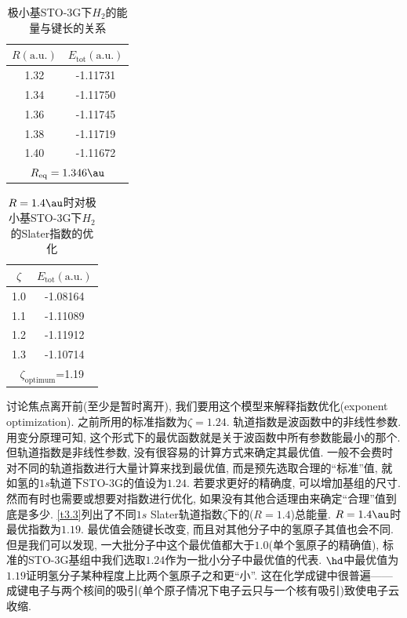 \begin{table}[H]
	\centering
	\caption{极小基STO-3G下$H_2$的能量与键长的关系}
	\begin{tabular}{cc}
		\hline
		$R \mathrm{(a.u.)}$ & $E_\mathrm{tot}\mathrm{(a.u.)}$\\\hline
		1.32      & -1.11731\\
		1.34     & -1.11750\\
		1.36     & -1.11745\\
		1.38     & -1.11719\\
		1.40     & -1.11672\\\hline
		\multicolumn{2}{c}{$R_\mathrm{eq}=1.346\au$}
	\end{tabular}
	\label{t3.2}
\end{table}
\begin{table}[H]
	\centering
	\caption{$R=1.4\au$时对极小基STO-3G下$H_2$的Slater指数的优化}
	\begin{tabular}{cc}
		\hline
		$\zeta$ & $E_\mathrm{tot} \mathrm{(a.u.)}$\\\hline
		1.0      & -1.08164\\
		1.1     & -1.11089\\
		1.2     & -1.11912\\
		1.3     & -1.10714\\\hline
		\multicolumn{2}{c}{$\zeta_\mathrm{optimum}$=1.19}
	\end{tabular}
	\label{t3.3}
\end{table}
讨论焦点离开前(至少是暂时离开), 
我们要用这个模型来解释指数优化(exponent optimization). 
之前所用的标准指数为$\zeta=1.24$. 
轨道指数是波函数中的非线性参数. 
用变分原理可知, 
这个形式下的最优函数就是关于波函数中所有参数能最小的那个. 
但轨道指数是非线性参数, 
没有很容易的计算方式来确定其最优值. 
一般不会费时对不同的轨道指数进行大量计算来找到最优值, 
而是预先选取合理的``标准''值, 
就如氢的$1s$轨道下STO-3G的值设为$1.24$. 
若要求更好的精确度, 
可以增加基组的尺寸. 
然而有时也需要或想要对指数进行优化, 
如果没有其他合适理由来确定``合理''值到底是多少. 
\autoref{t3.3}列出了不同$1s$ Slater轨道指数$\zeta$下的($R=1.4$)总能量. 
$R=1.4\au$时最优指数为$1.19$. 
最优值会随键长改变, 
而且对其他分子中的氢原子其值也会不同. 
但是我们可以发现, 
一大批分子中这个最优值都大于$1.0$(单个氢原子的精确值), 
标准的STO-3G基组中我们选取$1.24$作为一批小分子中最优值的代表. 
$\hd$中最优值为$1.19$证明氢分子某种程度上比两个氢原子之和更``小”. 
这在化学成键中很普遍——成键电子与两个核间的吸引(单个原子情况下电子云只与一个核有吸引)致使电子云收缩. 

